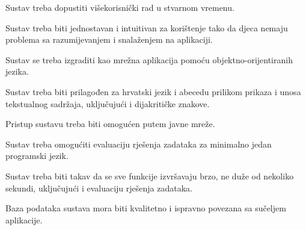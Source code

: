 			 \begin{packed_item}
			 	
			 	\item Sustav treba dopustiti višekorisnički rad u stvarnom vremenu.
			 	\item Sustav treba biti jednostavan i intuitivan za korištenje tako da djeca nemaju problema sa razumijevanjem i snalaženjem na aplikaciji.
			 	\item Sustav se treba izgraditi kao mrežna aplikacija pomoću objektno-orijentiranih jezika.
			 	\item Sustav treba biti prilagođen za hrvatski jezik i abecedu prilikom prikaza i unosa tekstualnog sadržaja, uključujući i dijakritičke znakove.
			 	\item Pristup sustavu treba biti omogućen putem javne mreže.
			 	\item Sustav treba omogućiti evaluaciju rješenja zadataka za minimalno jedan programski jezik.
			 	\item Sustav treba biti takav da se sve funkcije izvršavaju brzo, ne duže od nekoliko sekundi, uključujući i evaluaciju rješenja zadataka.
			 	\item Baza podataka sustava mora biti kvalitetno i ispravno povezana sa sučeljem aplikacije.
			 	
			 \end{packed_item}
			 
	